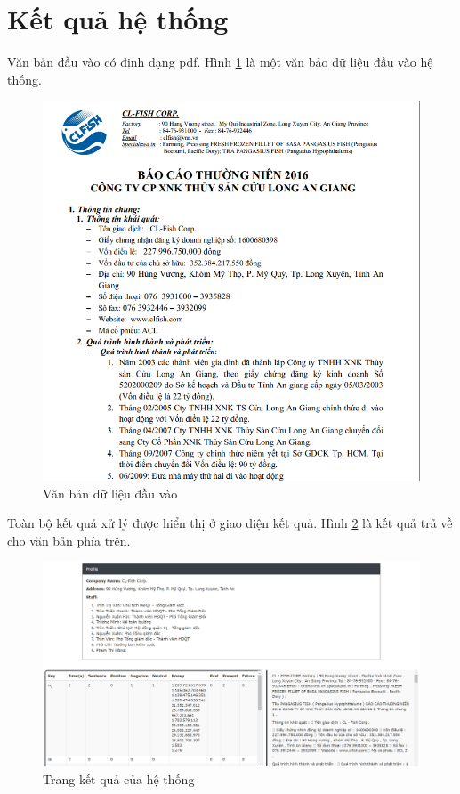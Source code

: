 \documentclass[14pt]{extreport}
\begin{document}
\section{Kết quả hệ thống}
Văn bản đầu vào có định dạng pdf. Hình \ref{fig:input_doc} là một văn bảo dữ liệu đầu vào hệ thống.\\
\begin{figure}
    \centering
    \includegraphics[scale= 0.5]{image/input_doc.PNG}
    \caption{Văn bản dữ liệu đầu vào}
    \label{fig:input_doc}
\end{figure}
Toàn bộ kết quả xử lý được hiển thị ở giao diện kết quả. Hình \ref{fig:output} là kết quả trả về cho văn bản phía trên.\\
\begin{figure}
    \centering
    \includegraphics[scale= 0.4]{image/Output.PNG}
    \caption{Trang kết quả của hệ thống}
    \label{fig:output}
\end{figure}
\end{document}
